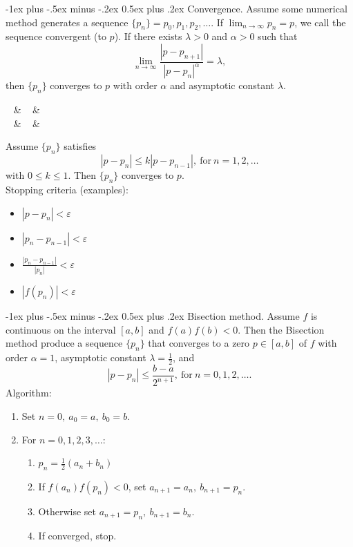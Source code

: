 \documentclass[10pt,landscape,a4paper]{article}
\makeatletter
\renewcommand{\section}{\@startsection{section}{1}{0mm}%
	{-1ex plus -.5ex minus -.2ex}%
	{0.5ex plus .2ex}%
	{\normalfont\large\bfseries}}
\makeatother
\begin{document}
\begin{multicols}{3}
	\section{Convergence.}
	Assume some numerical method generates a sequence $ \{p_n\}=p_0,p_1,p_2,\hdots $.
	If $ \lim_{n\rightarrow\infty}{p_n}=p $, we call the sequence convergent (to $ p $).
	If there exists $ \lambda>0 $ and $ \alpha>0 $ such that
	\[
		\lim_{n\rightarrow\infty}\frac{|p-p_{n+1}|}{|p-p_n|^\alpha}=\lambda,
	\]
	then $ \{p_n\} $ converges to $ p $ with order $ \alpha $ and asymptotic constant $ \lambda $.
	\begin{flalign*}
		 \  & \       &  \\
		 \  & \  & 
	\end{flalign*}
	Assume $ \{p_n\} $ satisfies
	\[
		|p-p_n|\leq k|p-p_{n-1}|, \ \text{for} \ n=1,2,\hdots
	\]
	with $ 0\leq k\leq1 $. Then $ \{p_n\} $ converges to $ p $.\\
	Stopping criteria (examples):
	\begin{itemize}
		\item $ |p-p_n|<\varepsilon $
		\item $ |p_n-p_{n-1}|<\varepsilon $
		\item $ \frac{|p_n-p_{n-1}|}{|p_n|}<\varepsilon $
		\item $ |f(p_n)|<\varepsilon $
	\end{itemize}
	
	\section{Bisection method.}
	Assume $ f $ is continuous on the interval $ [a,b] $ and $ f(a)f(b)<0 $.
	Then the Bisection method produce a sequence $ \{p_n\} $ that converges to a zero $ p\in[a,b] $ of $ f $ with order $ \alpha=1 $, asymptotic constant $ \lambda=\frac{1}{2} $, and
	\[
		|p-p_n|\leq\frac{b-a}{2^{n+1}}, \ \text{for} \ n=0,1,2,\hdots.
	\]
	Algorithm:
	\begin{enumerate}
		\item Set $ n=0, \ a_0=a, \ b_0=b $.
		\item For $ n=0,1,2,3,\hdots $:
		      \begin{enumerate}
			      \item $ p_n=\frac{1}{2}(a_n+b_n) $
			      \item If $ f(a_n)f(p_n)<0 $, set $ a_{n+1}=a_n, \ b_{n+1}=p_n $.
			      \item Otherwise set $ a_{n+1}=p_n, \ b_{n+1}=b_n $.
			      \item If converged, stop.
		      \end{enumerate}
	\end{enumerate}
	

\end{multicols}
\end{document}
